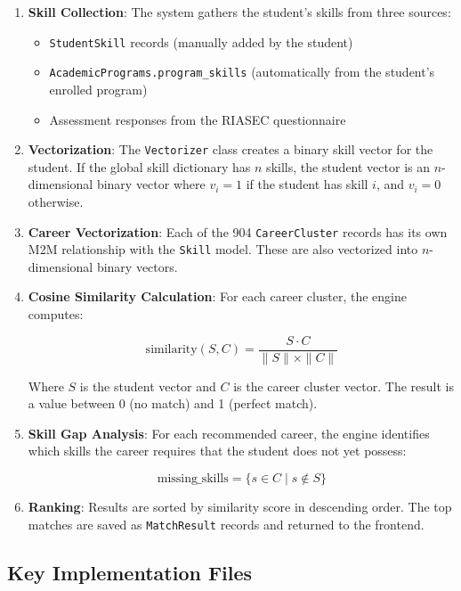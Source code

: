 \documentclass[12pt, a4paper]{article}
\begin{document}
\begin{enumerate}
    \item \textbf{Skill Collection}: The system gathers the student's skills from three sources:
    \begin{itemize}
        \item \texttt{StudentSkill} records (manually added by the student)
        \item \texttt{AcademicPrograms.program\_skills} (automatically from the student's enrolled program)
        \item Assessment responses from the RIASEC questionnaire
    \end{itemize}
    
    \item \textbf{Vectorization}: The \texttt{Vectorizer} class creates a binary skill vector for the student. If the global skill dictionary has $n$ skills, the student vector is an $n$-dimensional binary vector where $v_i = 1$ if the student has skill $i$, and $v_i = 0$ otherwise.
    
    \item \textbf{Career Vectorization}: Each of the 904 \texttt{CareerCluster} records has its own M2M relationship with the \texttt{Skill} model. These are also vectorized into $n$-dimensional binary vectors.
    
    \item \textbf{Cosine Similarity Calculation}: For each career cluster, the engine computes:
    
    \[
    \text{similarity}(S, C) = \frac{S \cdot C}{\|S\| \times \|C\|}
    \]
    
    Where $S$ is the student vector and $C$ is the career cluster vector. The result is a value between 0 (no match) and 1 (perfect match).
    
    \item \textbf{Skill Gap Analysis}: For each recommended career, the engine identifies which skills the career requires that the student does not yet possess:
    
    \[
    \text{missing\_skills} = \{s \in C \mid s \notin S\}
    \]
    
    \item \textbf{Ranking}: Results are sorted by similarity score in descending order. The top matches are saved as \texttt{MatchResult} records and returned to the frontend.
\end{enumerate}

\subsection{Key Implementation Files}
\end{document}
